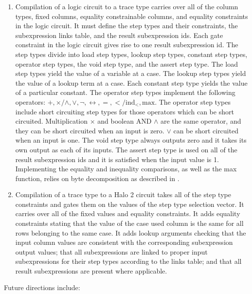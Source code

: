 \documentclass[11pt]{article}
\begin{document}
\begin{enumerate}
	\item Compilation of a logic circuit to a trace type carries over all of the column types, fixed columns, equality constrainable columns, and equality constraints in the logic circuit. It must define the step types and their constraints, the subexpression links table, and the result subexpression ids. Each gate constraint in the logic circuit gives rise to one result subexpression id. The step types divide into load step types, lookup step types, constant step types, operator step types, the void step type, and the assert step type. The load step types yield the value of a variable at a case. The lookup step types yield the value of a lookup term at a case. Each constant step type yields the value of a particular constant. The operator step types implement the following operators: $+, \times / \wedge, \vee, \neg, \leftrightarrow, =, < / \text{ind}_<, \text{max}$. The operator step types include short circuiting step types for those operators which can be short circuited. Multiplication $\times$ and boolean AND $\wedge$ are the same operator, and they can be short circuited when an input is zero. $\vee$ can be short circuited when an input is one. The void step type always outputs zero and it takes its own output as each of its inputs. The assert step type is used on all of the result subexpression ids and it is satisfied when the input value is 1. Implementing the equality and inequality comparisons, as well as the max function, relies on byte decomposition as described in \cite{sigma11}.
	\item Compilation of a trace type to a Halo 2 circuit takes all of the step type constraints and gates them on the values of the step type selection vector. It carries over all of the fixed values and equality constraints. It adds equality constraints stating that the value of the case used column is the same for all rows belonging to the same case. It adds lookup arguments checking that the input column values are consistent with the corresponding subexpression output values; that all subexpressions are linked to proper input subexpressions for their step types according to the links table; and that all result subexpressions are present where applicable.
\end{enumerate}

Future directions include:
\end{document}
